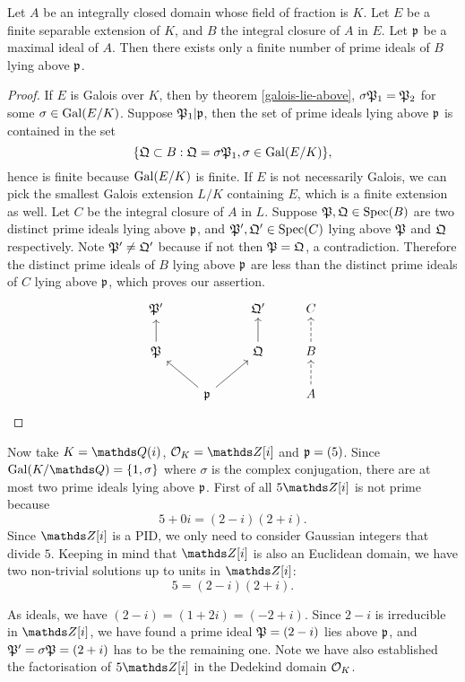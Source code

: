 			\begin{corollary} 
				Let $A$ be an integrally closed domain whose field of fraction is $K$. Let $E$ be a finite separable extension of $K$, and $B$ the integral closure of $A$ in $E$. Let $\mathfrak{p}$ be a maximal ideal of $A$. Then there exists only a finite number of prime ideals of $B$ lying above $\mathfrak{p}$.
			\end{corollary}
			\begin{proof}
				 If $E$ is Galois over $K$, then by theorem \ref{galois-lie-above}, $\sigma\mathfrak{P}_1 = \mathfrak{P}_2$ for some $\sigma \in \operatorname{Gal}(E/K)$. Suppose $\mathfrak{P}_1|\mathfrak{p}$, then the set of prime ideals lying above $\mathfrak{p}$ is contained in the set
				\[
					\{\mathfrak{Q} \subset B: \mathfrak{Q}=\sigma\mathfrak{P}_1,\sigma\in\operatorname{Gal}(E/K)\},
				\]
				hence is finite because $\operatorname{Gal}(E/K)$ is finite. If $E$ is not necessarily Galois, we can pick the smallest Galois extension $L/K$ containing $E$, which is a finite extension as well. Let $C$ be the integral closure of $A$ in $L$. Suppose $\mathfrak{P},\mathfrak{Q} \in \operatorname{Spec}(B)$ are two distinct prime ideals lying above $\mathfrak{p}$, and $\mathfrak{P}',\mathfrak{Q}' \in \operatorname{Spec}(C)$ lying above $\mathfrak{P}$ and $\mathfrak{Q}$ respectively. Note $\mathfrak{P}' \ne \mathfrak{Q}'$ because if not then $\mathfrak{P}=\mathfrak{Q}$, a contradiction. Therefore the distinct prime ideals of $B$ lying above $\mathfrak{p}$ are less than the distinct prime ideals of $C$ lying above $\mathfrak{p}$, which proves our assertion.
				\[
					\begin{tikzcd}
						\mathfrak{P}'          &                                    & \mathfrak{Q}'          & C                   \\
						\mathfrak{P} \arrow[u] &                                    & \mathfrak{Q} \arrow[u] & B \arrow[u, dashed] \\
						& \mathfrak{p} \arrow[lu] \arrow[ru] &                        & A \arrow[u, dashed]
					\end{tikzcd}
				\]
			\end{proof}
			\begin{example}\label{gauss-int-1}
				Now take $K=\Q(i)$, $\OK=\Z[i]$ and $\mathfrak{p}=(5)$. Since $\gal(K/\Q)=\{1,\sigma\}$ where $\sigma$ is the complex conjugation, there are at most two prime ideals lying above $\mathfrak{p}$. First of all $5\Z[i]$ is not prime because 
				\[
					5+0i = (2-i)(2+i).
				\]
				Since $\Z[i]$ is a PID, we only need to consider Gaussian integers that divide $5$. Keeping in mind that $\Z[i]$ is also an Euclidean domain, we have two non-trivial solutions up to units in $\Z[i]$:
				\[
					5 = (2-i)(2+i).
				\]
				
				As ideals, we have $(2-i)=(1+2i)=(-2+i)$. Since $2-i$ is irreducible in $\Z[i]$, we have found a prime ideal $\mathfrak{P}=(2-i)$ lies above $\mathfrak{p}$, and $\mathfrak{P}'=\sigma\mathfrak{P}=(2+i)$ has to be the remaining one. Note we have also established the factorisation of $5\Z[i]$ in the Dedekind domain $\mathcal{O}_K$.
					
			\end{example}
		
